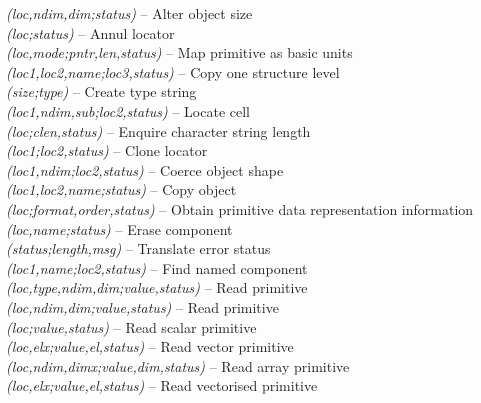 \documentclass[twoside,11pt]{starlink}
\providecommand{\st}[1]{{\emph{#1}}}
\begin{document}
\label{appendix:datroutines}
\textbf{}\st{(loc,ndim,dim;status)} -- Alter object size \\
\textbf{}\st{(loc;status)} -- Annul locator \\
\textbf{}\st{(loc,mode;pntr,len,status)} -- Map primitive as basic units \\
\textbf{}\st{(loc1,loc2,name;loc3,status)} -- Copy one structure level\\
\textbf{}\st{(size;type)} -- Create type string\\
\textbf{}\st{(loc1,ndim,sub;loc2,status)} -- Locate cell \\
\textbf{}\st{(loc;clen,status)} -- Enquire character string length \\
\textbf{}\st{(loc1;loc2,status)} -- Clone locator \\
\textbf{}\st{(loc1,ndim;loc2,status)} -- Coerce object shape \\
\textbf{}\st{(loc1,loc2,name;status)} -- Copy object \\
\textbf{}\st{(loc;format,order,status)} -- Obtain primitive data representation information\\
\textbf{}\st{(loc,name;status)} -- Erase component \\
\textbf{}\st{(status;length,msg)} -- Translate error status\\
\textbf{}\st{(loc1,name;loc2,status)} -- Find named component \\
\textbf{}\st{(loc,type,ndim,dim;value,status)} -- Read primitive \\
\textbf{}\st{(loc,ndim,dim;value,status)} -- Read primitive \\
\textbf{}\st{(loc;value,status)} -- Read scalar primitive\\
\textbf{}\st{(loc,elx;value,el,status)} -- Read vector primitive\\
\textbf{}\st{(loc,ndim,dimx;value,dim,status)} -- Read array primitive\\
\textbf{}\st{(loc,elx;value,el,status)} -- Read vectorised primitive\\
\end{document}
